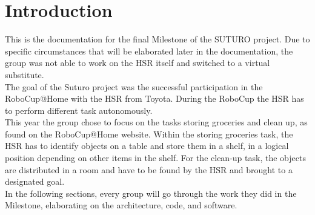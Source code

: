 \documentclass[main.tex]{subfiles}
\begin{document}
	\chapter{Introduction}

This is the documentation for the final Milestone of the SUTURO project. Due to specific circumstances that will be elaborated later in the documentation, the group was not able to work on the HSR itself and switched to a virtual substitute.\\
	The goal of the Suturo project was the successful participation in the RoboCup@Home with the HSR from Toyota. During the RoboCup the HSR has to perform different task autonomously.\\ 
	This year the group chose to focus on the tasks storing groceries and clean up, as found on the RoboCup@Home website. Within the storing groceries task, the HSR has to identify objects on a table and store them in a shelf, in a logical position depending on other items in the shelf. For the clean-up task, the objects are distributed in a room and have to be found by the HSR and brought to a designated goal.\\
	In the following sections, every group will go through the work they did in the Milestone, elaborating on the architecture, code, and software.\\
	
\end{document}
